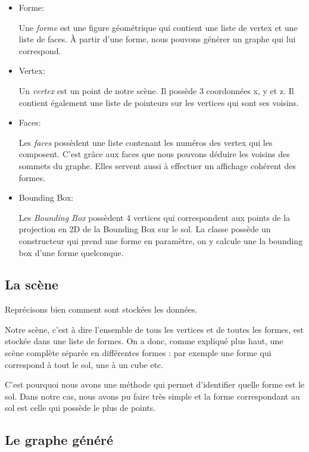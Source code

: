 \documentclass[a4paper,12pt]{report}
\begin{document}
\begin{itemize}
 \item Forme:

Une \textit{forme} est une figure géométrique qui contient une liste de vertex et une liste de faces. À partir d'une forme, nous pouvons générer un graphe qui lui correspond.
 
 \item Vertex:

Un \textit{vertex} est un point de notre scène. Il possède 3 coordonnées x, y et z. Il contient également une liste de pointeurs sur les vertices qui sont ses voisins.

 \item Faces:

Les \textit{faces} possèdent une liste contenant les numéros des vertex qui les composent. C'est grâce aux faces que nous pouvons déduire les voisins des sommets du graphe. Elles servent aussi à effectuer un affichage cohérent des formes.

 \item Bounding Box:

Les \textit{Bounding Box} possèdent 4 vertices qui correspondent aux points de la projection en 2D de la Bounding Box sur le sol. La classe possède un constructeur qui prend une forme en paramètre, on y calcule une la bounding box d'une forme quelconque.

\end{itemize}


\subsection{La scène}

Reprécisons bien comment sont stockées les données.

Notre scène, c'est à dire l'ensemble de tous les vertices et de toutes les formes, est stockée dans une liste de formes. On a donc, comme expliqué plus haut, une scène complète séparée en différentes formes : par exemple une forme qui correspond à tout le sol, une à un cube etc.

C'est pourquoi nous avons une méthode qui permet d'identifier quelle forme est le sol. Dans notre cas, nous avons pu faire très simple et la forme correspondant au sol est celle qui possède le plus de points.

\subsection{Le graphe généré}
\end{document}
